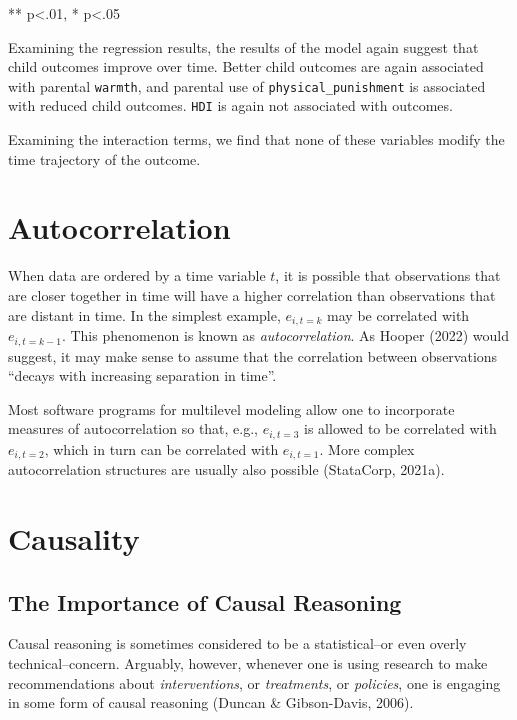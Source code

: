 \documentclass[
  letterpaper,
  DIV=11,
  numbers=noendperiod]{scrreprt}
\begin{document}
** p\textless.01, * p\textless.05

Examining the regression results, the results of the model again suggest
that child outcomes improve over time. Better child outcomes are again
associated with parental \texttt{warmth}, and parental use of
\texttt{physical\_punishment} is associated with reduced child outcomes.
\texttt{HDI} is again not associated with outcomes.

Examining the interaction terms, we find that none of these variables
modify the time trajectory of the outcome.

\section{Autocorrelation}\label{autocorrelation}

When data are ordered by a time variable \(t\), it is possible that
observations that are closer together in time will have a higher
correlation than observations that are distant in time. In the simplest
example, \(e_{i, t=k}\) may be correlated with \(e_{i, t=k-1}\). This
phenomenon is known as \emph{autocorrelation}. As Hooper (2022) would
suggest, it may make sense to assume that the correlation between
observations ``decays with increasing separation in time''.

Most software programs for multilevel modeling allow one to incorporate
measures of autocorrelation so that, e.g., \(e_{i,t=3}\) is allowed to
be correlated with \(e_{i,t=2}\), which in turn can be correlated with
\(e_{i,t=1}\). More complex autocorrelation structures are usually also
possible (StataCorp, 2021a).

\section{Causality}\label{causality}

\subsection{The Importance of Causal
Reasoning}\label{the-importance-of-causal-reasoning}

Causal reasoning is sometimes considered to be a statistical--or even
overly technical--concern. Arguably, however, whenever one is using
research to make recommendations about \emph{interventions}, or
\emph{treatments}, or \emph{policies}, one is engaging in some form of
causal reasoning (Duncan \& Gibson-Davis, 2006).
\end{document}
